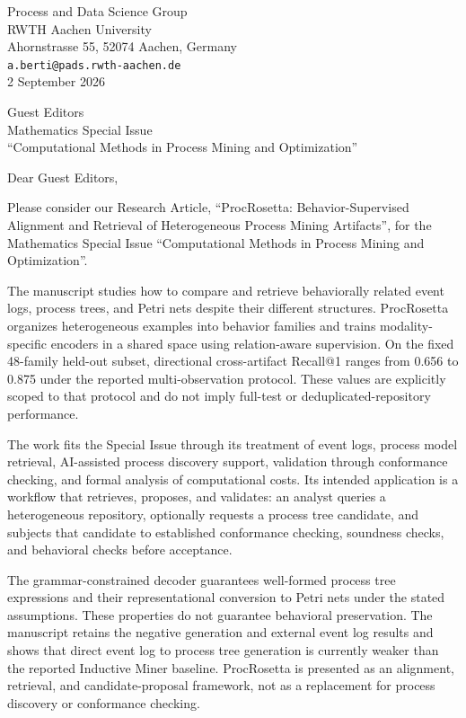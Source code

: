 \documentclass[10pt]{article}
\begin{document}
\begin{flushright}
Process and Data Science Group\\
RWTH Aachen University\\
Ahornstrasse 55, 52074 Aachen, Germany\\
\texttt{a.berti@pads.rwth-aachen.de}\\[5pt]
2 September 2026
\end{flushright}

Guest Editors\\
Mathematics Special Issue\\
``Computational Methods in Process Mining and Optimization''

Dear Guest Editors,

Please consider our Research Article, ``ProcRosetta: Behavior-Supervised Alignment and Retrieval of Heterogeneous Process Mining Artifacts'', for the Mathematics Special Issue ``Computational Methods in Process Mining and Optimization''.

The manuscript studies how to compare and retrieve behaviorally related event logs, process trees, and Petri nets despite their different structures. ProcRosetta organizes heterogeneous examples into behavior families and trains modality-specific encoders in a shared space using relation-aware supervision. On the fixed 48-family held-out subset, directional cross-artifact Recall@1 ranges from 0.656 to 0.875 under the reported multi-observation protocol. These values are explicitly scoped to that protocol and do not imply full-test or deduplicated-repository performance.

The work fits the Special Issue through its treatment of event logs, process model retrieval, AI-assisted process discovery support, validation through conformance checking, and formal analysis of computational costs. Its intended application is a workflow that retrieves, proposes, and validates: an analyst queries a heterogeneous repository, optionally requests a process tree candidate, and subjects that candidate to established conformance checking, soundness checks, and behavioral checks before acceptance.

The grammar-constrained decoder guarantees well-formed process tree expressions and their representational conversion to Petri nets under the stated assumptions. These properties do not guarantee behavioral preservation. The manuscript retains the negative generation and external event log results and shows that direct event log to process tree generation is currently weaker than the reported Inductive Miner baseline. ProcRosetta is presented as an alignment, retrieval, and candidate-proposal framework, not as a replacement for process discovery or conformance checking.
\end{document}
